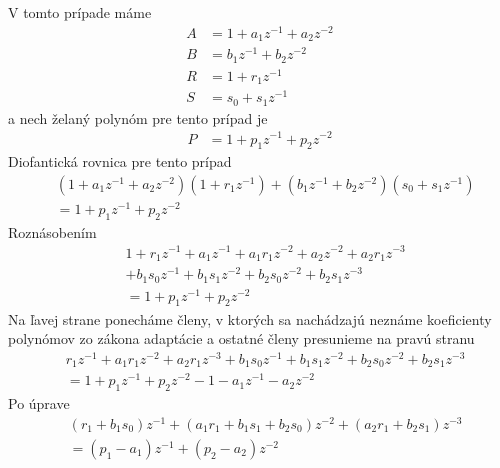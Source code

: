 \documentclass[a4paper, 10pt, ]{article}
\begin{document}
V tomto prípade máme
\begin{subequations}
	\begin{align}
		A & = 1 + a_1z^{-1} + a_2z^{-2} \\
		B & = b_1z^{-1} + b_2z^{-2} \\
		R & = 1 + r_1z^{-1} \\
		S & = s_0 + s_1z^{-1}
	\end{align}
\end{subequations}
a nech želaný polynóm pre tento prípad je
\begin{equation}
	\begin{split}
		P & = 1 + p_1z^{-1} + p_2z^{-2}
	\end{split}
\end{equation}
Diofantická rovnica pre tento prípad
\begin{equation}
	\begin{split}
		& \left( 1 + a_1z^{-1} + a_2z^{-2} \right) \left( 1 + r_1z^{-1} \right) + \left( b_1z^{-1} + b_2z^{-2} \right) \left( s_0 + s_1z^{-1} \right) \\
		&= 1 + p_1z^{-1} + p_2z^{-2}
	\end{split}
\end{equation}
Roznásobením
\begin{equation}
	\begin{split}
		& 1+r_1z^{-1}+a_1z^{-1} + a_1r_1z^{-2}+a_2z^{-2}+a_2r_1z^{-3} \\
		&+ b_1s_0z^{-1}+b_1s_1z^{-2} + b_2s_0z^{-2}+b_2s_1z^{-3} \\
		&= 1 + p_1z^{-1} + p_2z^{-2}
	\end{split}
\end{equation}
Na ľavej strane ponecháme členy, v ktorých sa nachádzajú neznáme koeficienty polynómov zo zákona adaptácie a ostatné členy presunieme na pravú stranu
\begin{equation}
	\begin{split}
		& r_1z^{-1} + a_1r_1z^{-2}+a_2r_1z^{-3} + b_1s_0z^{-1}+b_1s_1z^{-2} + b_2s_0z^{-2}+b_2s_1z^{-3} \\
		&= 1 + p_1z^{-1} + p_2z^{-2} - 1 -a_1z^{-1} -a_2z^{-2}
	\end{split}
\end{equation}
Po úprave
\begin{equation}
	\begin{split}
		& \left({ r_1 + b_1s_0 }\right) z^{-1} + \left({ a_1r_1 +b_1s_1 + b_2s_0 }\right) z^{-2} + \left({ a_2r_1 +b_2s_1 }\right) z^{-3} \\
		&= \left({ p_1 -a_1 }\right) z^{-1} + \left({p_2 -  a_2 }\right) z^{-2}
	\end{split}
\end{equation}
\end{document}
